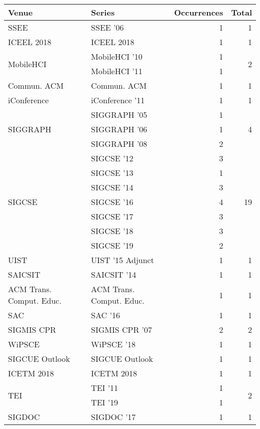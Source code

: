 \begin{table*}[t]
\begin{tabular}{llrr}
Venue & Series & Occurrences & Total\\\hline
\multirow{1}{*}{SSEE } & SSEE '06 & 1 & \multirow{1}{*}{1}\\
\multirow{1}{*}{ICEEL 2018} & ICEEL 2018 & 1 & \multirow{1}{*}{1}\\
\multirow{2}{*}{MobileHCI } & MobileHCI '10 & 1 & \multirow{2}{*}{2}\\
& MobileHCI '11 & 1 &\\
\multirow{1}{*}{Commun. ACM} & Commun. ACM & 1 & \multirow{1}{*}{1}\\
\multirow{1}{*}{iConference } & iConference '11 & 1 & \multirow{1}{*}{1}\\
\multirow{3}{*}{SIGGRAPH } & SIGGRAPH '05 & 1 & \multirow{3}{*}{4}\\
& SIGGRAPH '06 & 1 &\\
& SIGGRAPH '08 & 2 &\\
\multirow{7}{*}{SIGCSE } & SIGCSE '12 & 3 & \multirow{7}{*}{19}\\
& SIGCSE '13 & 1 &\\
& SIGCSE '14 & 3 &\\
& SIGCSE '16 & 4 &\\
& SIGCSE '17 & 3 &\\
& SIGCSE '18 & 3 &\\
& SIGCSE '19 & 2 &\\
\multirow{1}{*}{UIST } & UIST '15 Adjunct & 1 & \multirow{1}{*}{1}\\
\multirow{1}{*}{SAICSIT } & SAICSIT '14 & 1 & \multirow{1}{*}{1}\\
\multirow{1}{*}{ACM Trans. Comput. Educ.} & ACM Trans. Comput. Educ. & 1 & \multirow{1}{*}{1}\\
\multirow{1}{*}{SAC } & SAC '16 & 1 & \multirow{1}{*}{1}\\
\multirow{1}{*}{SIGMIS CPR } & SIGMIS CPR '07 & 2 & \multirow{1}{*}{2}\\
\multirow{1}{*}{WiPSCE } & WiPSCE '18 & 1 & \multirow{1}{*}{1}\\
\multirow{1}{*}{SIGCUE Outlook} & SIGCUE Outlook & 1 & \multirow{1}{*}{1}\\
\multirow{1}{*}{ICETM 2018} & ICETM 2018 & 1 & \multirow{1}{*}{1}\\
\multirow{2}{*}{TEI } & TEI '11 & 1 & \multirow{2}{*}{2}\\
& TEI '19 & 1 &\\
\multirow{1}{*}{SIGDOC } & SIGDOC '17 & 1 & \multirow{1}{*}{1}\\

\end{tabular}
\end{table*}
